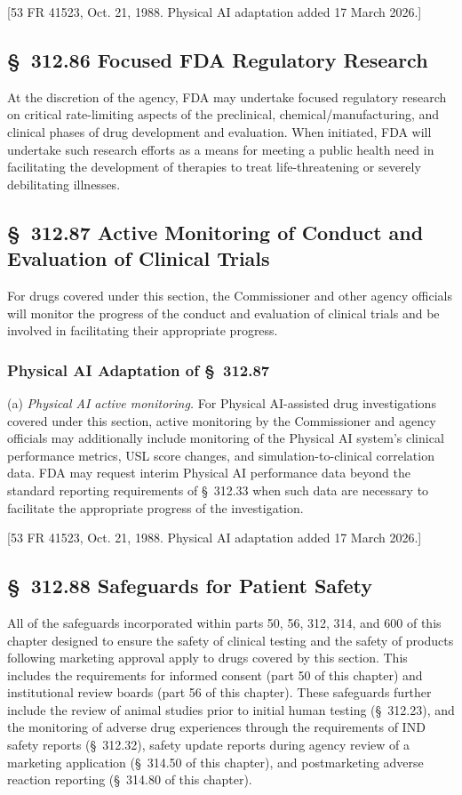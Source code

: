 \documentclass[11pt]{article}
\begin{document}
[53 FR 41523, Oct. 21, 1988. Physical AI adaptation added 17 March 2026.]

\subsection{\S~312.86 Focused FDA Regulatory Research}

At the discretion of the agency, FDA may undertake focused regulatory research on critical rate-limiting aspects of the preclinical, chemical/manufacturing, and clinical phases of drug development and evaluation. When initiated, FDA will undertake such research efforts as a means for meeting a public health need in facilitating the development of therapies to treat life-threatening or severely debilitating illnesses.

\subsection{\S~312.87 Active Monitoring of Conduct and Evaluation of Clinical Trials}

For drugs covered under this section, the Commissioner and other agency officials will monitor the progress of the conduct and evaluation of clinical trials and be involved in facilitating their appropriate progress.

\subsubsection{Physical AI Adaptation of \S~312.87}

(a) \textit{Physical AI active monitoring.} For Physical AI-assisted drug investigations covered under this section, active monitoring by the Commissioner and agency officials may additionally include monitoring of the Physical AI system's clinical performance metrics, USL score changes, and simulation-to-clinical correlation data. FDA may request interim Physical AI performance data beyond the standard reporting requirements of \S~312.33 when such data are necessary to facilitate the appropriate progress of the investigation.

[53 FR 41523, Oct. 21, 1988. Physical AI adaptation added 17 March 2026.]

\subsection{\S~312.88 Safeguards for Patient Safety}

All of the safeguards incorporated within parts 50, 56, 312, 314, and 600 of this chapter designed to ensure the safety of clinical testing and the safety of products following marketing approval apply to drugs covered by this section. This includes the requirements for informed consent (part 50 of this chapter) and institutional review boards (part 56 of this chapter). These safeguards further include the review of animal studies prior to initial human testing (\S~312.23), and the monitoring of adverse drug experiences through the requirements of IND safety reports (\S~312.32), safety update reports during agency review of a marketing application (\S~314.50 of this chapter), and postmarketing adverse reaction reporting (\S~314.80 of this chapter).
\end{document}
